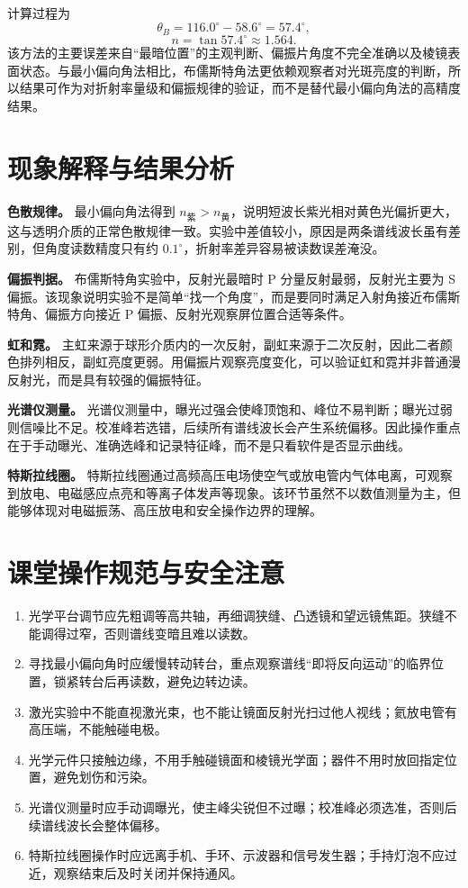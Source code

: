 \documentclass[UTF8,12pt,a4paper]{ctexart}
\newcommand{\scorepoint}[1]{\noindent\textbf{#1}\quad}
\begin{document}
计算过程为
\[
    \theta_B=116.0^\circ-58.6^\circ=57.4^\circ,
\]
\[
    n=\tan57.4^\circ\approx1.564 .
\]
该方法的主要误差来自“最暗位置”的主观判断、偏振片角度不完全准确以及棱镜表面状态。与最小偏向角法相比，布儒斯特角法更依赖观察者对光斑亮度的判断，所以结果可作为对折射率量级和偏振规律的验证，而不是替代最小偏向角法的高精度结果。

\section{现象解释与结果分析}

\scorepoint{色散规律。}
最小偏向角法得到 \(n_{\text{紫}}>n_{\text{黄}}\)，说明短波长紫光相对黄色光偏折更大，这与透明介质的正常色散规律一致。实验中差值较小，原因是两条谱线波长虽有差别，但角度读数精度只有约 \(0.1^\circ\)，折射率差异容易被读数误差淹没。

\scorepoint{偏振判据。}
布儒斯特角实验中，反射光最暗时 P 分量反射最弱，反射光主要为 S 偏振。该现象说明实验不是简单“找一个角度”，而是要同时满足入射角接近布儒斯特角、偏振方向接近 P 偏振、反射光观察屏位置合适等条件。

\scorepoint{虹和霓。}
主虹来源于球形介质内的一次反射，副虹来源于二次反射，因此二者颜色排列相反，副虹亮度更弱。用偏振片观察亮度变化，可以验证虹和霓并非普通漫反射光，而是具有较强的偏振特征。

\scorepoint{光谱仪测量。}
光谱仪测量中，曝光过强会使峰顶饱和、峰位不易判断；曝光过弱则信噪比不足。校准峰若选错，后续所有谱线波长会产生系统偏移。因此操作重点在于手动曝光、准确选峰和记录特征峰，而不是只看软件是否显示曲线。

\scorepoint{特斯拉线圈。}
特斯拉线圈通过高频高压电场使空气或放电管内气体电离，可观察到放电、电磁感应点亮和等离子体发声等现象。该环节虽然不以数值测量为主，但能够体现对电磁振荡、高压放电和安全操作边界的理解。

\section{课堂操作规范与安全注意}

\begin{enumerate}[label=\arabic*.,leftmargin=2.2em]
    \item 光学平台调节应先粗调等高共轴，再细调狭缝、凸透镜和望远镜焦距。狭缝不能调得过窄，否则谱线变暗且难以读数。
    \item 寻找最小偏向角时应缓慢转动转台，重点观察谱线“即将反向运动”的临界位置，锁紧转台后再读数，避免边转边读。
    \item 激光实验中不能直视激光束，也不能让镜面反射光扫过他人视线；氦放电管有高压端，不能触碰电极。
    \item 光学元件只接触边缘，不用手触碰镜面和棱镜光学面；器件不用时放回指定位置，避免划伤和污染。
    \item 光谱仪测量时应手动调曝光，使主峰尖锐但不过曝；校准峰必须选准，否则后续谱线波长会整体偏移。
    \item 特斯拉线圈操作时应远离手机、手环、示波器和信号发生器；手持灯泡不应过近，观察结束后及时关闭并保持通风。
\end{enumerate}
\end{document}
